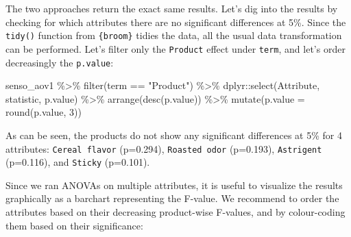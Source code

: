 \documentclass[
]{book}
\newenvironment{Shaded}{\begin{snugshade}}{\end{snugshade}}
\newcommand{\AttributeTok}[1]{\textcolor[rgb]{0.77,0.63,0.00}{#1}}
\newcommand{\DecValTok}[1]{\textcolor[rgb]{0.00,0.00,0.81}{#1}}
\newcommand{\FunctionTok}[1]{\textcolor[rgb]{0.00,0.00,0.00}{#1}}
\newcommand{\NormalTok}[1]{#1}
\newcommand{\SpecialCharTok}[1]{\textcolor[rgb]{0.00,0.00,0.00}{#1}}
\newcommand{\StringTok}[1]{\textcolor[rgb]{0.31,0.60,0.02}{#1}}
\begin{document}
The two approaches return the exact same results. Let's dig into the results by checking for which attributes there are no significant differences at 5\%. Since the \texttt{tidy()} function from \texttt{\{broom\}} tidies the data, all the usual data transformation can be performed. Let's filter only the \texttt{Product} effect under \texttt{term}, and let's order decreasingly the \texttt{p.value}:

\begin{Shaded}
\begin{Highlighting}[]
\NormalTok{senso\_aov1 }\SpecialCharTok{\%\textgreater{}\%} 
  \FunctionTok{filter}\NormalTok{(term }\SpecialCharTok{==} \StringTok{"Product"}\NormalTok{) }\SpecialCharTok{\%\textgreater{}\%} 
\NormalTok{  dplyr}\SpecialCharTok{::}\FunctionTok{select}\NormalTok{(Attribute, statistic, p.value) }\SpecialCharTok{\%\textgreater{}\%} 
  \FunctionTok{arrange}\NormalTok{(}\FunctionTok{desc}\NormalTok{(p.value)) }\SpecialCharTok{\%\textgreater{}\%} 
  \FunctionTok{mutate}\NormalTok{(}\AttributeTok{p.value =} \FunctionTok{round}\NormalTok{(p.value, }\DecValTok{3}\NormalTok{))}
\end{Highlighting}
\end{Shaded}

As can be seen, the products do not show any significant differences at 5\% for 4 attributes: \texttt{Cereal\ flavor} (p=0.294), \texttt{Roasted\ odor} (p=0.193), \texttt{Astrigent} (p=0.116), and \texttt{Sticky} (p=0.101).

Since we ran ANOVAs on multiple attributes, it is useful to visualize the results graphically as a barchart representing the F-value. We recommend to order the attributes based on their decreasing product-wise F-values, and by colour-coding them based on their significance:
\end{document}
